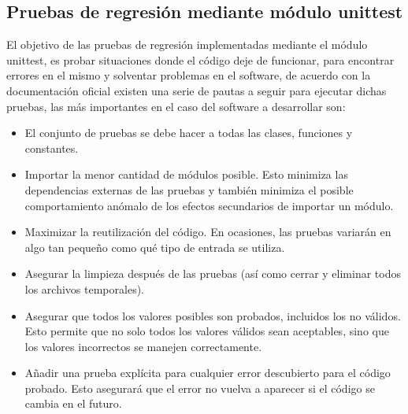 \subsection{Pruebas de regresión mediante módulo unittest}
El objetivo de las pruebas de regresión implementadas mediante el módulo unittest, es probar situaciones donde el código deje de funcionar, para encontrar errores en el mismo y solventar problemas en el software, de acuerdo con la documentación oficial \cite{pruebas-regresion} existen una serie de pautas a seguir para ejecutar dichas pruebas, las más importantes en el caso del software a desarrollar son:
\begin{itemize}
    \item El conjunto de pruebas se debe hacer a todas las clases, funciones y constantes.
    \item Importar la menor cantidad de módulos posible. Esto minimiza las dependencias externas de las pruebas y también minimiza el posible comportamiento anómalo de los efectos secundarios de importar un módulo.
    \item Maximizar la reutilización del código. En ocasiones, las pruebas variarán en algo tan pequeño como qué tipo de entrada se utiliza.
    \item Asegurar la limpieza después de las pruebas (así como cerrar y eliminar todos los archivos temporales).
    \item Asegurar que todos los valores posibles son probados, incluidos los no válidos. Esto permite que no solo todos los valores válidos sean aceptables, sino que los valores incorrectos se manejen correctamente.
    \item Añadir una prueba explícita para cualquier error descubierto para el código probado. Esto asegurará que el error no vuelva a aparecer si el código se cambia en el futuro.
\end{itemize}